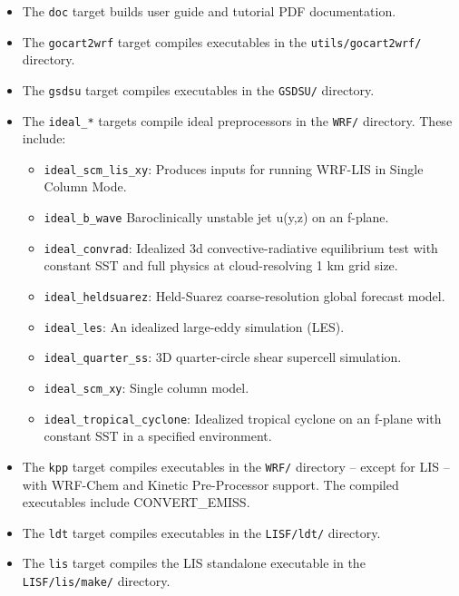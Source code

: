 \begin{itemize}
\begin{itemize}
  \item The \texttt{doc} target builds user guide and tutorial PDF documentation.

  \item The \texttt{gocart2wrf} target compiles executables in the
    \texttt{utils/gocart2wrf/} directory. 

  \item The \texttt{gsdsu} target compiles executables in the \texttt{GSDSU/}
    directory.

  \item The \texttt{ideal\_*} targets compile ideal preprocessors in the \texttt{WRF/}
    directory.   These include:
  \begin{itemize}  
     \item \texttt{ideal\_scm\_lis\_xy}: Produces inputs for running WRF-LIS in Single Column Mode.
     \item \texttt{ideal\_b\_wave} Baroclinically unstable jet u(y,z) on an f-plane.
     \item \texttt{ideal\_convrad}: Idealized 3d convective-radiative equilibrium test with constant SST
   and full physics at cloud-resolving 1 km grid size.
     \item \texttt{ideal\_heldsuarez}: Held-Suarez coarse-resolution global forecast model.
     \item \texttt{ideal\_les}: An idealized large-eddy simulation (LES).
     \item \texttt{ideal\_quarter\_ss}: 3D quarter-circle shear supercell simulation.
     \item \texttt{ideal\_scm\_xy}: Single column model.
     \item \texttt{ideal\_tropical\_cyclone}: Idealized tropical cyclone on an f-plane with constant SST in a
   specified environment.
  \end{itemize}

  \item The \texttt{kpp} target compiles executables in the \texttt{WRF/}
    directory -- except for LIS -- with WRF-Chem and Kinetic Pre-Processor
    support. The compiled executables include CONVERT\_EMISS.
  
  \item The \texttt{ldt} target compiles executables in the \texttt{LISF/ldt/} 
    directory.

  \item The \texttt{lis} target compiles the LIS standalone executable in the 
    \texttt{LISF/lis/make/} directory.


\end{itemize}
\end{itemize}
